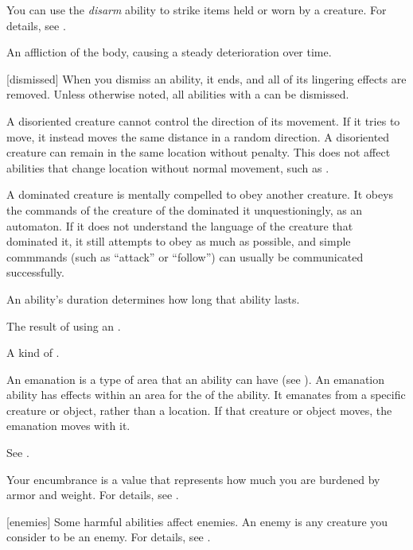  You can use the \textit{disarm} ability to strike items held or worn by a creature.
For details, see .

 An affliction of the body, causing a steady deterioration over time.

[dismissed] When you dismiss an ability, it ends, and all of its lingering effects are removed.
Unless otherwise noted, all abilities with a  can be dismissed.

 A disoriented creature cannot control the direction of its movement.
If it tries to move, it instead moves the same distance in a random direction.
A disoriented creature can remain in the same location without penalty.
This does not affect abilities that change location without normal movement, such as .

 A dominated creature is mentally compelled to obey another creature.
It obeys the commands of the creature of the dominated it unquestioningly, as an automaton.
If it does not understand the language of the creature that dominated it, it still attempts to obey as much as possible, and simple commmands (such as ``attack'' or ``follow'') can usually be communicated successfully.

 An ability's duration determines how long that ability lasts.

 The result of using an .

 A kind of .

 An emanation is a type of area that an ability can have (see ).
An emanation ability has effects within an area for the  of the ability.
It emanates from a specific creature or object, rather than a location.
If that creature or object moves, the emanation moves with it.

 See .

 Your encumbrance is a value that represents how much you are burdened by armor and weight.
For details, see .

[enemies] Some harmful abilities affect enemies.
An enemy is any creature you consider to be an enemy.
For details, see .

